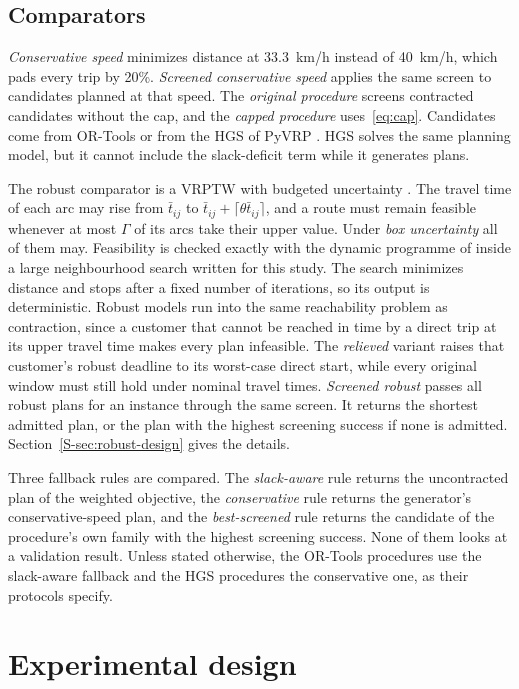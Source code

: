 \documentclass{itor}
\newcommand{\SI}[1]{Section~\ref{S-#1}}
\begin{document}
\subsection{Comparators}

\emph{Conservative speed} minimizes distance at 33.3~km/h instead of 40~km/h,
which pads every trip by 20\%. \emph{Screened conservative speed} applies the
same screen to candidates planned at that speed. The \emph{original procedure}
screens contracted candidates without the cap, and the \emph{capped procedure}
uses~\eqref{eq:cap}. Candidates come from OR-Tools \citep{ortools} or from the
HGS of PyVRP \citep{wouda2024}. HGS solves the same planning model, but it
cannot include the slack-deficit term while it generates plans.

The robust comparator is a VRPTW with budgeted uncertainty
\citep{bertsimas2004,agra2013}. The travel time of each arc may rise from
$\bar t_{ij}$ to $\bar t_{ij}+\lceil\theta\bar t_{ij}\rceil$, and a route must
remain feasible whenever at most $\Gamma$ of its arcs take their upper value.
Under \emph{box uncertainty} all of them may. Feasibility is checked exactly with
the dynamic programme of \citet{agra2013} inside a large neighbourhood search
written for this study. The search minimizes distance and stops after a fixed
number of iterations, so its output is deterministic. Robust models run into
the same reachability problem as contraction, since a customer that cannot be
reached in time by a direct trip at its upper travel time makes every plan
infeasible. The \emph{relieved} variant raises that customer's robust deadline to
its worst-case direct start, while every original window must still hold under
nominal travel times. \emph{Screened robust} passes all robust plans for an
instance through the same screen. It returns the shortest admitted plan, or the
plan with the highest screening success if none is admitted.
\SI{sec:robust-design} gives the details.

Three fallback rules are compared. The \emph{slack-aware} rule returns the
uncontracted plan of the weighted objective, the \emph{conservative} rule
returns the generator's conservative-speed plan, and the \emph{best-screened}
rule returns the candidate of the procedure's own family with the highest
screening success. None of them looks at a validation result. Unless stated
otherwise, the OR-Tools procedures use the slack-aware fallback and the HGS
procedures the conservative one, as their protocols specify.

\section{Experimental design}\label{sec:design}
\end{document}
